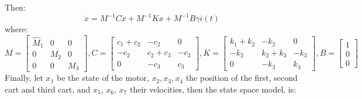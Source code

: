 Then:
\begin{equation}\ddot{x} = M^{-1}C\dot{x}+M^{-1}Kx+ M^{-1}B\gamma i(t)\end{equation}
where:
\begin{equation}M=\begin{bmatrix}
\hat{M}_1 & 0 & 0 \\
0 & M_2 & 0 \\
0 & 0 & M_3
\end{bmatrix}, C=\begin{bmatrix}
c_1+c_2 & -c_2 &0 \\
-c_2 & c_2+c_3 & -c_3 \\
0 & -c_3 & c_3
\end{bmatrix}, K=\begin{bmatrix}
k_1+k_2 & -k_2  &0\\
-k_2 & k_2+k_3 & -k_3 \\
0 & -k_3 & k_3
\end{bmatrix}, B=\begin{bmatrix}1\\ 0 \\0 \end{bmatrix}\end{equation}
Finally, let $x_1$ be the state of the motor, $x_2,x_3,x_4$ the position of the first, second cart and third cart, and $x_5$, $x_6$, $x_7$ their velocities, then the state space model, is:

